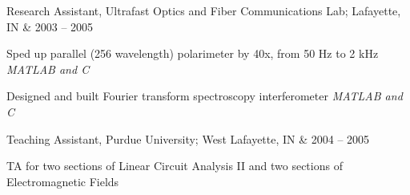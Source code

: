 \documentclass[letterpaper]{scrartcl}
\begin{document}
\begin{list1}
%			  
%
%

	\item \begin{tabular1bold} Research Assistant, Ultrafast Optics and Fiber Communications Lab; Lafayette, IN & 2003 -- 2005 \end{tabular1bold}
	\begin{list2}
		\item Sped up parallel (256 wavelength) polarimeter by 40x, from 50 Hz to 2 kHz \hfill \emph{MATLAB and C}
		\item Designed and built Fourier transform spectroscopy interferometer \hfill \emph{MATLAB and C}
	\end{list2}

	\item \begin{tabular1bold} Teaching Assistant, Purdue University; West Lafayette, IN & 2004 -- 2005 \end{tabular1bold}
	\begin{list2}
		\item TA for two sections of Linear Circuit Analysis II and two sections of Electromagnetic Fields 
	\end{list2}


\end{list1}
\end{document}
